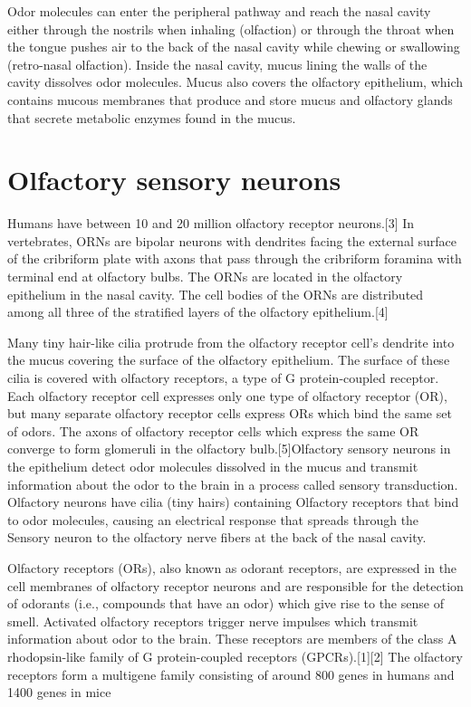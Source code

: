 \documentclass[]{book}
\begin{document}
Odor molecules can enter the peripheral pathway and reach the nasal cavity either through the nostrils when inhaling (olfaction) or through the throat when the tongue pushes air to the back of the nasal cavity while chewing or swallowing (retro-nasal olfaction). Inside the nasal cavity, mucus lining the walls of the cavity dissolves odor molecules. Mucus also covers the olfactory epithelium, which contains mucous membranes that produce and store mucus and olfactory glands that secrete metabolic enzymes found in the mucus.

\hypertarget{olfactory-sensory-neurons}{%
\section{Olfactory sensory neurons}\label{olfactory-sensory-neurons}}

Humans have between 10 and 20 million olfactory receptor neurons.{[}3{]} In vertebrates, ORNs are bipolar neurons with dendrites facing the external surface of the cribriform plate with axons that pass through the cribriform foramina with terminal end at olfactory bulbs. The ORNs are located in the olfactory epithelium in the nasal cavity. The cell bodies of the ORNs are distributed among all three of the stratified layers of the olfactory epithelium.{[}4{]}

Many tiny hair-like cilia protrude from the olfactory receptor cell's dendrite into the mucus covering the surface of the olfactory epithelium. The surface of these cilia is covered with olfactory receptors, a type of G protein-coupled receptor. Each olfactory receptor cell expresses only one type of olfactory receptor (OR), but many separate olfactory receptor cells express ORs which bind the same set of odors. The axons of olfactory receptor cells which express the same OR converge to form glomeruli in the olfactory bulb.{[}5{]}Olfactory sensory neurons in the epithelium detect odor molecules dissolved in the mucus and transmit information about the odor to the brain in a process called sensory transduction. Olfactory neurons have cilia (tiny hairs) containing Olfactory receptors that bind to odor molecules, causing an electrical response that spreads through the Sensory neuron to the olfactory nerve fibers at the back of the nasal cavity.

Olfactory receptors (ORs), also known as odorant receptors, are expressed in the cell membranes of olfactory receptor neurons and are responsible for the detection of odorants (i.e., compounds that have an odor) which give rise to the sense of smell. Activated olfactory receptors trigger nerve impulses which transmit information about odor to the brain. These receptors are members of the class A rhodopsin-like family of G protein-coupled receptors (GPCRs).{[}1{]}{[}2{]} The olfactory receptors form a multigene family consisting of around 800 genes in humans and 1400 genes in mice
\end{document}
